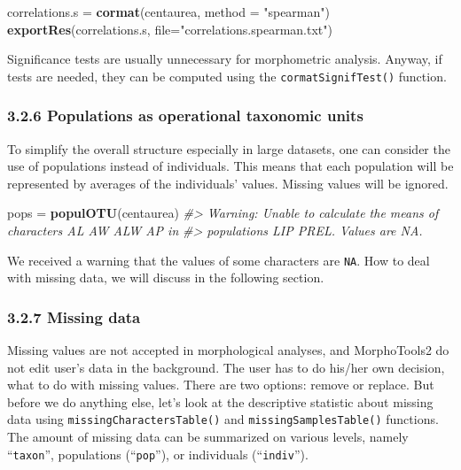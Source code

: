 \documentclass[
]{article}
\newenvironment{Shaded}{\begin{snugshade}}{\end{snugshade}}
\newcommand{\CommentTok}[1]{\textcolor[rgb]{0.56,0.35,0.01}{\textit{#1}}}
\newcommand{\DataTypeTok}[1]{\textcolor[rgb]{0.13,0.29,0.53}{#1}}
\newcommand{\KeywordTok}[1]{\textcolor[rgb]{0.13,0.29,0.53}{\textbf{#1}}}
\newcommand{\NormalTok}[1]{#1}
\newcommand{\StringTok}[1]{\textcolor[rgb]{0.31,0.60,0.02}{#1}}
\begin{document}
\begin{Shaded}
\begin{Highlighting}[]
\NormalTok{correlations.s =}\StringTok{ }\KeywordTok{cormat}\NormalTok{(centaurea, }\DataTypeTok{method =} \StringTok{"spearman"}\NormalTok{)}
\KeywordTok{exportRes}\NormalTok{(correlations.s, }\DataTypeTok{file=}\StringTok{"correlations.spearman.txt"}\NormalTok{)}
\end{Highlighting}
\end{Shaded}

Significance tests are usually unnecessary for morphometric analysis.
Anyway, if tests are needed, they can be computed using the
\texttt{cormatSignifTest()} function.

\hypertarget{populations-as-operational-taxonomic-units}{%
\subsubsection{3.2.6 Populations as operational taxonomic
units}\label{populations-as-operational-taxonomic-units}}

To simplify the overall structure especially in large datasets, one can
consider the use of populations instead of individuals. This means that
each population will be represented by averages of the individuals'
values. Missing values will be ignored.

\begin{Shaded}
\begin{Highlighting}[]
\NormalTok{pops =}\StringTok{ }\KeywordTok{populOTU}\NormalTok{(centaurea)}
\CommentTok{#> Warning: Unable to calculate the means of characters AL AW ALW AP in}
\CommentTok{#> populations LIP PREL. Values are NA.}
\end{Highlighting}
\end{Shaded}

We received a warning that the values of some characters are
\texttt{NA}. How to deal with missing data, we will discuss in the
following section.

\hypertarget{missing-data}{%
\subsubsection{3.2.7 Missing data}\label{missing-data}}

Missing values are not accepted in morphological analyses, and
MorphoTools2 do not edit user's data in the background. The user has to
do his/her own decision, what to do with missing values. There are two
options: remove or replace. But before we do anything else, let's look
at the descriptive statistic about missing data using
\texttt{missingCharactersTable()} and \texttt{missingSamplesTable()}
functions. The amount of missing data can be summarized on various
levels, namely ``\texttt{taxon}'', populations (``\texttt{pop}''), or
individuals (``\texttt{indiv}'').
\end{document}
